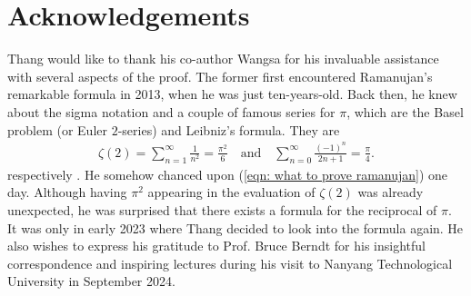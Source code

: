 \documentclass[11pt]{amsart}
\theoremstyle{definition}
\numberwithin{theorem}{section}
\begin{document}
\section{Acknowledgements}
Thang would like to thank his co-author Wangsa for his invaluable assistance with several aspects of the proof. The former first encountered Ramanujan's remarkable formula in 2013, when he was just ten-years-old. Back then, he knew about the sigma notation and a couple of famous series for $\pi$, which are the Basel problem (or Euler $2$-series) and Leibniz's formula. They are  \begin{align*}
    \zeta\left(2\right)=\sum_{n=1}^{\infty}\frac{1}{n^2}=\frac{\pi^2}{6}\quad\text{and}\quad \sum_{n=0}^{\infty}\frac{\left(-1\right)^n}{2n+1}=\frac{\pi}{4}.
\end{align*}
respectively \cite{wong}. He somehow chanced upon (\ref{eqn: what to prove ramanujan}) one day. Although having $\pi^2$ appearing in the evaluation of $\zeta\left(2\right)$ was already unexpected, he was surprised that there exists a formula for the reciprocal of $\pi$. It was only in early 2023 where Thang decided to look into the formula again. He also wishes to express his gratitude to Prof. Bruce Berndt for his insightful correspondence and inspiring lectures during his visit to Nanyang Technological University in September 2024.
\end{document}
